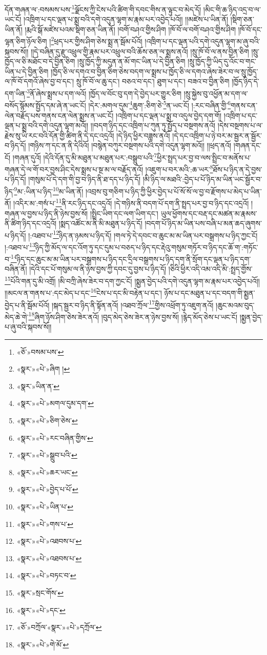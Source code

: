 དོན་གཞན་ལ་:བསམས་པས་\footnote{«ཅོ་»བསམ་པས་}ལྗོངས་ཀྱི་ངེས་པའི་ཚིག་གི་དབང་གིས་ན་ལྟུང་བ་མེད་དོ། །མིང་གི་ཆ་ཉིད་འདྲ་བ་ལ་ཡང་ངོ། །འཁྲིག་པ་དང་ལྡན་པ་སྨྲ་བའི་དགེ་འདུན་ལྷག་མ་རྣམ་པར་འབྱེད་པའོ།། །།མཛེས་པ་ཡིན་ནོ། །སྡིག་ཅན་ཡིན་ནོ། །རྨའི་སྒོ་མཛེས་པའམ་སྡིག་ཅན་ཡིན་ནོ། །བགོ་བཤའ་གྱིས་ཤིག །ཁོ་བོ་ལ་བགོ་བཤའ་གྱིས་ཤིག །ཁོ་བོ་དང་ལྷན་ཅིག་ཉོལ་ཅིག །\footnote{«སྣར་»«པེ་»ཞིག །}ཕྲད་པར་གྱིས་ཤིག་ཅེས་སྨྲ་ན་སྦོམ་པོའོ། །འཁྲིག་པ་དང་ལྡན་པའི་དགེ་འདུན་ལྷག་མ་ཞུ་བའི་སྐབས་སོ།། །།དེ་བཞིན་དུ་རྫུ་འཕྲུལ་གྱི་རྣམ་པར་འཕྲུལ་བའི་ཆོས་ཅན་ལ་སྨྲས་ནའོ། །སྲུ་ཁོ་བོ་ལ་ནས་བྱིན་ཅིག །སྲུ་ཁྱོད་ལ་ཅི་མཐོང་བ་དེ་བྱིན་ཅིག །སྲུ་ཁྱོད་ཀྱི་མདུན་ན་མོ་གང་ཡིན་པ་དེ་བྱིན་ཅིག །སྲུ་ཁྱོད་ཀྱི་ཡིད་དུ་འོང་བ་གང་ཡིན་པ་དེ་བྱིན་ཅིག །ཁྱོད་ཅི་ལ་དགའ་བ་བྱིན་ཅིག་ཅེས་བདག་ལ་སྨྲས་པ་ཁྱོད་ཅི་ལ་དགའ་ཞེས་ཟེར་བ་ལ་སྲུ་ཁྱོད་ལ་ཁོ་བོ་དགའོ་ཞེས་བྱ་བ་དང་། སྲུ་ཁོ་བོ་ལ་ཆུ་དང་། བཅའ་བ་དང་། ཐུག་པ་དང་། བཟའ་བ་བྱིན་ཅིག །ཁྱོད་ཉིད་དེ་དག་ཡིན་\footnote{«སྣར་»ཡིན་ན་}ནོ་ཞེས་སྨྲས་པ་དག་ལའོ། །ཁྱོད་ལ་བོང་བུ་དག་དེ་བྱེད་པར་གྱུར་ཅིག །སྲུ་སྐྱེས་བུ་འཕྱོན་མ་དག་ལ་བསོད་སྙོམས་སྤྱོད་དམ་ཞེ་ན་ཡང་ངོ། །དེར་:མགལ་དུམ་\footnote{«སྣར་»«པེ་»མགལ་དུམ་དག་}ཆུག་:ཅིག་ཅེ་\footnote{«སྣར་»«པེ་»ཅིག་ཅེས་}ན་ཡང་ངོ། །:རང་བཞིན་གྱི་\footnote{«སྣར་»«པེ་»རང་བཞིན་གྱིས་}གནས་ངན་ལེན་བརྗོད་པས་གནས་ངན་ལེན་སྨྲས་ན་ཡང་ངོ། །འཁྲིག་པ་དང་ལྡན་པ་སྨྲ་བ་འདུལ་བྱེད་དག་གོ། །འཁྲིག་པ་དང་ལྡན་པ་སྨྲ་བའི་དགེ་འདུན་ལྷག་མའོ།། །།བདག་ཉིད་དང་འཁྲིག་པ་ཀུན་ཏུ་སྤྱོད་པ་བསྔགས་ནའོ། །དེས་བསྔགས་པ་ལ་རྗེས་སུ་ཡི་རང་བའི་དོན་གྱི་ཚིག་ནི་དེ་དང་འདྲའོ། །དེ་ཉིད་ཕྱིར་བཟླས་ནའོ། །དེ་དང་འཁྲིག་པ་ཉེ་བར་མ་སྦྱར་ན་སྦྱོར་བ་ཉིད་དོ། །གཉིས་ཀ་དང་ན་ནི་དེའིའོ། །བསྙེན་བཀུར་བསྔགས་པའི་དགེ་འདུན་ལྷག་མའོ།། །།ཕྲད་ནའོ། །གཞན་དང་ངོ། །གཞན་དུའོ། །དེའི་དོན་དུ་མི་མཐུན་པ་མཐུན་པར་:བསྒྲུབ་པའི་\footnote{«སྣར་»«པེ་»སྒྲུབ་པའི་}ཕྱིར་སྤྲད་པར་བྱ་བ་ལས་སྤྲིང་བ་མནོས་པ་གཞན་དེ་ལ་གོ་བར་བྱས་ཤིང་དེས་སྨྲས་པ་སྔ་མ་ལ་བརྗོད་ནའོ། །འཇུག་པ་བར་མའི་:ཆ་ཡར་\footnote{«སྣར་»«པེ་»ཆར་ཡང་}ཐོས་པ་ཉིད་ན་དེ་བྱས་པ་ཉིད་དོ། །གསུམ་པོ་དེ་དག་གི་བྱ་བ་ཉིད་ནི་ཐ་དད་པ་ཉིད་དོ། །མི་ཉིད་ལ་མཐའི་:བྱེད་པ་པོ་ཉིད་མ་ཡིན་ཡང་སྦྱོར་བ་ཉིད་\footnote{«སྣར་»«པེ་»བྱེད་པ་པོ་}མ་:ཡིན་པ་ཉིད་\footnote{«སྣར་»«པེ་»ཡིན་པ་}མ་ཡིན་ནོ། །འབྲས་བུ་གཅིག་པ་ཉིད་ཀྱི་ཕྱིར་བྱེད་པ་པོ་སོ་སོ་ལ་བྱ་བ་རྫོགས་པ་མེད་པ་ཡིན་ནོ། །འདིར་མ་:གསཾ་པ་\footnote{«སྣར་»«པེ་»གས་པ་}ནི་རང་ཉིད་དང་འདྲའོ། །དེ་གཉིས་ནི་བདག་པོ་དག་ནི་སྤྲད་པར་བྱ་བ་ཉིད་དང་འདྲའོ། །གཞན་ལ་བྱས་པ་ཉིད་ནི་ཉེས་བྱས་སོ། །སྤྲིང་ཡིག་དང་ལག་ཡིག་དང་། ཡུལ་ཕྱོགས་དང་བརྡ་དང་མཚན་མ་རྣམས་ནི་ཚིག་ཉིད་དང་འདྲའོ། །སྨད་འཚོང་མ་ནི་མི་མཐུན་པ་ཉིད་དོ། །བདག་པོ་ཉིད་མ་ཡིན་པས་བཞི་པ་མན་ཆད་ཞུགས་པ་ཉིད་དོ། །:འཐབ་པ་\footnote{«སྣར་»«པེ་»འཐབས་པ་}ཉིད་ན་ཉམས་པ་ཉིད་དོ། །གལ་ཏེ་དེ་དབང་བ་ཆུང་མ་མ་ཡིན་པར་བསྒྲགས་པ་ཉིད་ཀྱང་ངོ། །:འཐབ་པ་\footnote{«སྣར་»«པེ་»འཐབས་པ་}ཉིད་ཀྱི་མོད་ལ་དང་འོག་ཏུ་དང་དུམ་པ་བཅད་པ་ཉིད་དང་རྡེའུ་གསུམ་གཏོར་བ་ཉིད་དང་ཆོ་ག་:གཏོང་བ་\footnote{«སྣར་»«པེ་»བཏང་བ་}ཉིད་དང་ཆུང་མ་མ་ཡིན་པར་བསྒྲགས་པ་ཉིད་དང་དྲིལ་བསྒྲགས་པ་ཉིད་དག་ནི་སྲོག་དང་ལྡན་པ་ཉིད་དག་བཞིན་ནོ། །དེའི་དང་པོ་གསུམ་ལ་ནི་ཉེས་བྱས་ཀྱི་དབང་དུ་བྱས་པ་ཉིད་དོ། །ཅིའི་ཕྱིར་འདི་འམ་འདི་མི་:སྤྲད་གྱོས་\footnote{«སྣར་»སྲང་གོས་}པོའི་གན་དུ་མི་འགྲོ། །མི་བཀྲི་ཞེས་ཟེར་བ་དག་ཀྱང་ངོ། །སྨྱན་བྱེད་པའི་དགེ་འདུན་ལྷག་མ་རྣམ་པར་འབྱེད་པའོ།། །།མངལ་ན་གནས་པ་:དང་མེད་པ་དང་\footnote{«སྣར་»«པེ་»དང་}ངེས་པ་དང་མི་བརྟེན་པ་དང་། ཉོས་པ་དང་མཐུན་པ་དང་བདག་གི་སྨྱན་བྱེད་པ་ནི་སྦོམ་པོའོ། །སྐད་སྦྱར་བ་ཉིད་ནི་སྟོན་ནའོ། །འཐབ་ཀྲོལ་\footnote{«ཅོ་»བཀྲོལ་«སྣར་»«པེ་»དཀྲོལ་}གྱིས་འཕྲོག་ཏུ་འཇུག་ནའོ། །ཆུང་མའམ་བུད་མེད་ཆེ་གེ་\footnote{«སྣར་»«པེ་»གེ་མོ་}ཞིག་ཉོས་ཤིག་ཅེས་ཟེར་ནའོ། །བུད་མེད་ཅེས་ཟེར་ན་ཉེས་བྱས་སོ། །རྙེད་མོད་ཅེས་པ་ཡང་ངོ། །སྨྱན་བྱེད་པ་ཞུ་བའི་སྐབས་སོ།། 
